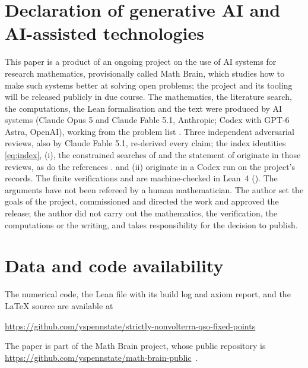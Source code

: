 \documentclass[11pt]{amsart}
\theoremstyle{definition}
\begin{document}
\section*{Declaration of generative AI and AI-assisted technologies}
This paper is a product of an ongoing project on the use of AI systems for research mathematics, provisionally called Math Brain, which studies how to make such systems better at solving open problems; the project and its tooling will be released publicly in due course. The mathematics, the literature search, the computations, the Lean formalisation and the text were produced by AI systems (Claude Opus 5 and Claude Fable 5.1, Anthropic; Codex with GPT-6 Astra, OpenAI), working from the problem list \cite{GR09}. Three independent adversarial reviews, also by Claude Fable 5.1, re-derived every claim; the index identities \eqref{eq:index}, (i), the constrained searches of  and the statement of  originate in those reviews, as do the references \cite{Jam16,Jam17}.  and (ii) originate in a Codex run on the project's records. The finite verifications and  are machine-checked in Lean~4 (). The arguments have not been refereed by a human mathematician. The author set the goals of the project, commissioned and directed the work and approved the release; the author did not carry out the mathematics, the verification, the computations or the writing, and takes responsibility for the decision to publish.

\section*{Data and code availability}
The numerical code, the Lean file with its build log and axiom report, and the \LaTeX{} source are available at
\begin{center}
\url{https://github.com/yspennstate/strictly-nonvolterra-qso-fixed-points}
\end{center}

The paper is part of the Math Brain project, whose public repository is \url{https://github.com/yspennstate/math-brain-public}~\cite{MathBrainRepo}.
\end{document}
